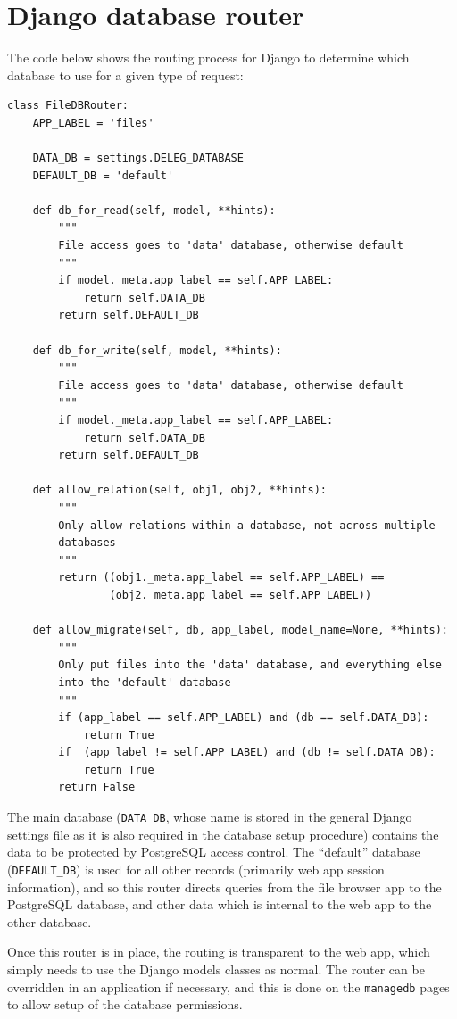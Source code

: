\documentclass[12pt]{report}
\begin{document}
\chapter{Django database router}
\label{sec:appendix2}
The code below shows the routing process for Django to determine which database to use for a given type of request:

\begin{verbatim}
class FileDBRouter:
    APP_LABEL = 'files'

    DATA_DB = settings.DELEG_DATABASE
    DEFAULT_DB = 'default'

    def db_for_read(self, model, **hints):
        """
        File access goes to 'data' database, otherwise default
        """
        if model._meta.app_label == self.APP_LABEL:
            return self.DATA_DB
        return self.DEFAULT_DB

    def db_for_write(self, model, **hints):
        """
        File access goes to 'data' database, otherwise default
        """
        if model._meta.app_label == self.APP_LABEL:
            return self.DATA_DB
        return self.DEFAULT_DB

    def allow_relation(self, obj1, obj2, **hints):
        """
        Only allow relations within a database, not across multiple
        databases
        """
        return ((obj1._meta.app_label == self.APP_LABEL) ==
                (obj2._meta.app_label == self.APP_LABEL))

    def allow_migrate(self, db, app_label, model_name=None, **hints):
        """
        Only put files into the 'data' database, and everything else
        into the 'default' database
        """
        if (app_label == self.APP_LABEL) and (db == self.DATA_DB):
            return True
        if  (app_label != self.APP_LABEL) and (db != self.DATA_DB):
            return True
        return False
\end{verbatim}

The main database (\verb+DATA_DB+, whose name is stored in the general Django settings file as it is also required in the database setup procedure) contains the data to be protected by PostgreSQL access control. The ``default'' database (\verb+DEFAULT_DB+) is used for all other records (primarily web app session information), and so this router directs queries from the file browser app to the PostgreSQL database, and other data which is internal to the web app to the other database.

Once this router is in place, the routing is transparent to the web app, which simply needs to use the Django models classes as normal. The router can be overridden in an application if necessary, and this is done on the \verb+managedb+ pages to allow setup of the database permissions.
\end{document}
